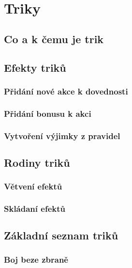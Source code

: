 \chapter{Triky}
\label{chap:triky}

\section{Co a k čemu je trik}
\label{sec:coakcemu-trik}

\section{Efekty triků}
\label{sec:trik-efekty}

\subsection{Přidání nové akce k dovednosti}
\label{sec:trik-pridani}

\subsection{Přidání bonusu k akci}
\label{sec:trik-bonus}

\subsection{Vytvoření výjimky z pravidel}
\label{sec:trik-vyjimky}

\section{Rodiny triků}
\label{sec:trik-rodiny}

\subsection{Větvení efektů}
\label{sec:trik-vetveni}

\subsection{Skládaní efektů}
\label{sec:trik-skladani}

\section{Základní seznam triků}
\label{sec:trik-zakladni}

\subsection{Boj beze zbraně}
\label{sec:trik-bbz}

